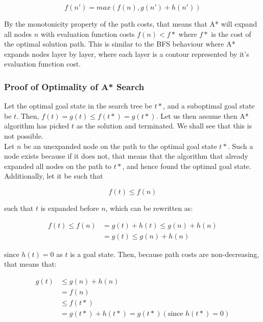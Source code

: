 \documentclass[12pt]{article}
\begin{document}
\begin{equation*}
f(n') = max(f(n), g(n') + h(n'))
\end{equation*}

By the monotonicity property of the path costs, that means that A* will expand all nodes $n$ with evaluation function costs $f(n) < f*$ where $f*$ is the cost of the optimal solution path. This is similar to the BFS behaviour where A* expands nodes layer by layer, where each layer is a contour represented by it's evaluation function cost.

\subsubsection{Proof of Optimality of A* Search}

Let the optimal goal state in the search tree be $t*$, and a suboptimal goal state be $t$. Then, $f(t) = g(t) \leq f(t*) = g(t*)$. Let us then assume then A* algorithm has picked $t$ as the solution and terminated. We shall see that this is not possible.\\

Let $n$ be an unexpanded node on the path to the optimal goal state $t*$. Such a node exists because if it does not, that means that the algorithm that already expanded all nodes on the path to $t*$, and hence found the optimal goal state. Additionally, let it be such that 

\begin{equation*}
f(t) \leq f(n)
\end{equation*}

such that $t$ is expanded before $n$, which can be rewritten as:

 \begin{equation*}
 \begin{aligned}
f(t) \leq f(n) & = g(t) + h(t) \leq g(n) + h(n)\\
&= g(t) \leq g(n) + h(n)
\end{aligned}
\end{equation*}

since $h(t) = 0$ as $t$ is a goal state. Then, because path costs are non-decreasing, that means that:

 \begin{equation*}
 \begin{aligned}
g(t) & \leq g(n) + h(n) \\
& = f(n) \\
& \leq f(t*) \\
& = g(t*) + h(t*) = g(t*) (\text{since $h(t*) = 0$})
\end{aligned}
\end{equation*}
\end{document}
